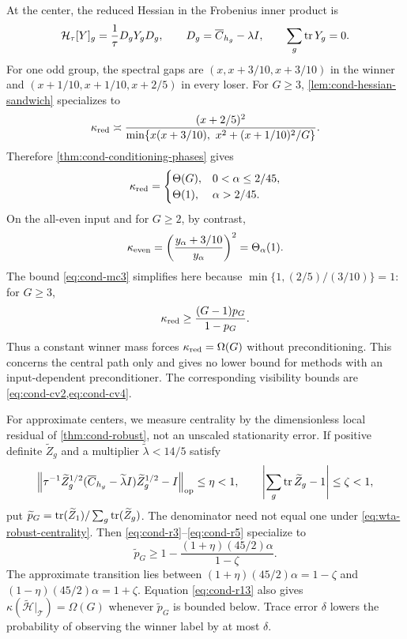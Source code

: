 At the center, the reduced Hessian in the Frobenius inner product is
\begin{equation}
 \mathcal H_\tau[Y]_g=\frac1\tau D_gY_gD_g,
 \qquad D_g=\overline C_{h_g}-\lambda I,
 \qquad \sum_g\operatorname{tr} Y_g=0.
 \label{eq:wta-central-hessian}
\end{equation}
For one odd group, the spectral gaps are
$(x,x+3/10,x+3/10)$ in the winner and
$(x+1/10,x+1/10,x+2/5)$ in every loser.  For $G\ge3$,
\cref{lem:cond-hessian-sandwich} specializes to
\begin{equation}
 \kappa_{\rm red}\asymp
 \frac{(x+2/5)^2}{
  \min\{x(x+3/10),\ x^2+(x+1/10)^2/G\}}.
 \label{eq:wta-kappa-finite}
\end{equation}
Therefore \cref{thm:cond-conditioning-phases} gives
\begin{equation}
 \kappa_{\rm red}=\begin{cases}
 \Theta(G),&0<\alpha\le2/45,\\
 \Theta(1),&\alpha>2/45.
 \end{cases}
 \label{eq:wta-conditioning-transition}
\end{equation}
On the all-even input and for $G\ge2$, by contrast,
\begin{equation}
 \kappa_{\rm even}=\left(\frac{y_\alpha+3/10}{y_\alpha}\right)^2
 =\Theta_\alpha(1).
 \label{eq:wta-even-conditioning}
\end{equation}
The bound \eqref{eq:cond-mc3} simplifies here because $\min\{1,(2/5)/(3/10)\}=1$: for $G\ge3$,
\begin{equation}
 \kappa_{\rm red}\ge\frac{(G-1)p_G}{1-p_G}.
 \label{eq:wta-mass-conditioning}
\end{equation}
Thus a constant winner mass forces $\kappa_{\rm red}=\Omega(G)$ without
preconditioning.  This concerns the central path only and gives no lower
bound for methods with an input-dependent preconditioner.  The corresponding
visibility bounds are \cref{eq:cond-cv2,eq:cond-cv4}.

For approximate centers, we measure centrality by the dimensionless local
residual of \cref{thm:cond-robust}, not an unscaled stationarity error.
If positive definite
$\widetilde Z_g$ and a multiplier $\widetilde\lambda<14/5$ satisfy
\begin{equation}
 \left\|\tau^{-1}\widetilde Z_g^{1/2}
 (\overline C_{h_g}-\widetilde\lambda I)
 \widetilde Z_g^{1/2}-I\right\|_{\rm op}\le\eta<1,
 \qquad
 \left|\sum_g\operatorname{tr}\widetilde Z_g-1\right|\le\zeta<1,
 \label{eq:wta-robust-centrality}
\end{equation}
put
$\widetilde p_G=\operatorname{tr}(\widetilde Z_1)/\sum_g\operatorname{tr}(\widetilde Z_g)$.
The denominator need not equal one under
\eqref{eq:wta-robust-centrality}.  Then
\eqref{eq:cond-r3}--\eqref{eq:cond-r5} specialize to
\begin{equation}
 \widetilde p_G\ge
 1-\frac{(1+\eta)(45/2)\alpha}{1-\zeta}.
 \label{eq:wta-robust-mass}
\end{equation}
The approximate transition lies between
$(1+\eta)(45/2)\alpha=1-\zeta$ and
$(1-\eta)(45/2)\alpha=1+\zeta$.
Equation \eqref{eq:cond-r13} also gives
$\kappa(\widetilde{\mathcal H}|_{\mathcal T})=\Omega(G)$ whenever
$\widetilde p_G$ is bounded below.  Trace error $\delta$ lowers the probability of observing the winner label
by at most $\delta$.

